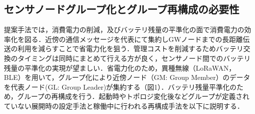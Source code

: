 \subsection{センサノードグループ化とグループ再構成の必要性}
提案手法では，消費電力の削減，及びバッテリ残量の平準化の面で消費電力の効率化を図る．近傍の通信メッセージを代表にて集約しGWノードまでの長距離伝送の利用を減らすことで省電力化を狙う．管理コストを削減するためバッテリ交換のタイミングは同時にまとめて行える方が良く，センサノード間でのバッテリ残量の平準化の実現が望ましい．省電力化のため，異種無線（LoRaWAN，BLE）を用いて，グループ化により近傍ノード（GM: Group Member）のデータを代表ノード(GL: Group Leader)が集約する（図1）．バッテリ残量平準化のため，グループの再構成を行う．起動時やトポロジ変化後などグループが定義されていない展開時の設定手法と稼働中に行われる再構成手法を以下に説明する．